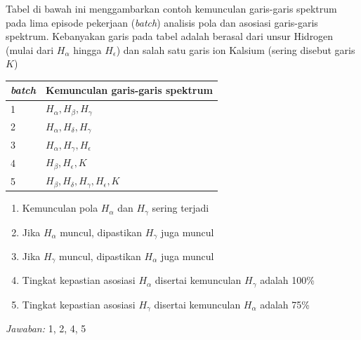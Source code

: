\documentclass[11pt,fleqn]{exam}
\begin{document}
\begin{questions}
\vspace{0.5cm}
\question Tabel di bawah ini menggambarkan contoh kemunculan garis-garis spektrum pada lima episode pekerjaan (\textit{batch}) analisis pola dan asosiasi garis-garis spektrum. Kebanyakan garis pada tabel adalah berasal dari unsur Hidrogen (mulai dari $H_{\alpha}$ hingga $H_{\epsilon}$) dan salah satu garis ion Kalsium (sering disebut garis $K$)
\begin{table}[H]
\centering
\begin{tabular}{| l | l |}
\hline
\textit{batch} & Kemunculan garis-garis spektrum \\
\hline
1              & $H_{\alpha}, H_{\beta}, H_{\gamma}$ \\
\hline
2              & $H_{\alpha}, H_{\delta}, H_{\gamma}$ \\
\hline
3              & $H_{\alpha}, H_{\gamma}, H_{\epsilon}$ \\
\hline
4              & $H_{\beta}, H_{\epsilon}, K$ \\
\hline
5              & $H_{\beta}, H_{\delta}, H_{\gamma}, H_{\epsilon}, K$\\
\hline
\end{tabular}
\end{table}
\begin{enumerate}
    \item Kemunculan pola  $H_{\alpha}$ dan $H_{\gamma}$ sering terjadi
    \item Jika $H_{\alpha}$ muncul, dipastikan $H_{\gamma}$ juga muncul
    \item Jika $H_{\gamma}$ muncul, dipastikan $H_{\alpha}$ juga muncul
    \item Tingkat kepastian asosiasi $H_{\alpha}$ disertai kemunculan $H_{\gamma}$ adalah 100\%
    \item Tingkat kepastian asosiasi $H_{\gamma}$ disertai kemunculan $H_{\alpha}$ adalah 75\%
\end{enumerate}

\bigskip
\textit{Jawaban: } 1, 2, 4, 5


\end{questions}
\end{document}
